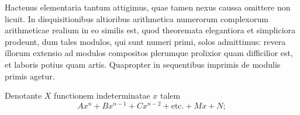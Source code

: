 Hactenus elementaria tantum attigimus, quae tamen nexus caussa omittere non licuit. In disquisitionibus altioribus arithmetica numerorum complexorum arithmeticae realium in eo similis est, quod theoremata elegantiora et simpliciora prodeunt, dum tales modulos, qui sunt numeri primi, solos admittimus: revera illorum extensio ad modulos compositos plerumque prolixior quam difficilior est, et laboris potius quam artis. Quapropter in sequentibus imprimis de modulis primis agetur.

Denotante $X$ functionem indeterminatae $x$ talem
\[
Ax^n+Bx^{n-1}+Cx^{n-2}+\text{etc.}+Mx+N;
\]
